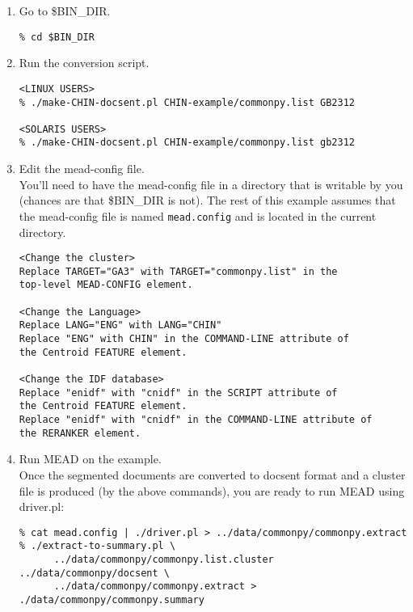 \documentclass[10pt]{article}
\begin{document}
\begin{enumerate}

\item Go to \$BIN\_DIR.

\begin{verbatim}
% cd $BIN_DIR
\end{verbatim}

\item Run the conversion script.\\

\begin{verbatim}
<LINUX USERS>
% ./make-CHIN-docsent.pl CHIN-example/commonpy.list GB2312

<SOLARIS USERS>
% ./make-CHIN-docsent.pl CHIN-example/commonpy.list gb2312
\end{verbatim}


\item Edit the mead-config file.\\

You'll need to have the mead-config file in a directory that
is writable by you (chances are that \$BIN\_DIR is not).  
The rest of this example assumes that the mead-config file
is named \verb|mead.config| and is located in the current
directory.

\begin{verbatim}
<Change the cluster>
Replace TARGET="GA3" with TARGET="commonpy.list" in the 
top-level MEAD-CONFIG element.

<Change the Language>
Replace LANG="ENG" with LANG="CHIN"
Replace "ENG" with CHIN" in the COMMAND-LINE attribute of
the Centroid FEATURE element.

<Change the IDF database>
Replace "enidf" with "cnidf" in the SCRIPT attribute of
the Centroid FEATURE element.
Replace "enidf" with "cnidf" in the COMMAND-LINE attribute of
the RERANKER element.
\end{verbatim}


\item Run MEAD on the example.\\

Once the segmented documents are converted to docsent format and
a cluster file is produced (by the above commands), you are 
ready to run MEAD using driver.pl:

\begin{verbatim}
% cat mead.config | ./driver.pl > ../data/commonpy/commonpy.extract
% ./extract-to-summary.pl \
      ../data/commonpy/commonpy.list.cluster ../data/commonpy/docsent \
      ../data/commonpy/commonpy.extract > ./data/commonpy/commonpy.summary
\end{verbatim}

\end{enumerate}
\end{document}
